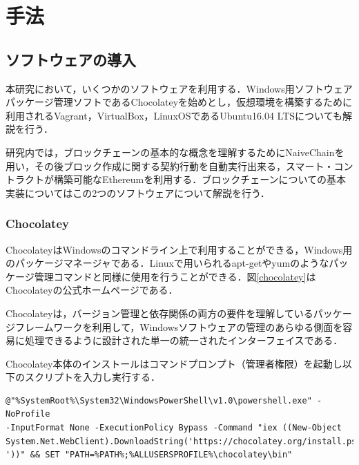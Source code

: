 \chapter{手法}

\section{ソフトウェアの導入}

本研究において，いくつかのソフトウェアを利用する．Windows用ソフトウェアパッケージ管理ソフトであるChocolateyを始めとし，仮想環境を構築するために利用されるVagrant，VirtualBox，LinuxOSであるUbuntu16.04 LTSについても解説を行う．

研究内では，ブロックチェーンの基本的な概念を理解するためにNaiveChainを用い，その後ブロック作成に関する契約行動を自動実行出来る，スマート・コントラクトが構築可能なEthereumを利用する．ブロックチェーンについての基本実装についてはこの2つのソフトウェアについて解説を行う．

\newpage

\subsection{Chocolatey}

Chocolatey\cite{chocolatey}はWindowsのコマンドライン上で利用することができる，Windows用のパッケージマネージャである．Linuxで用いられるapt-getやyumのようなパッケージ管理コマンドと同様に使用を行うことができる．図\ref{chocolatey}はChocolateyの公式ホームページである．

Chocolateyは，バージョン管理と依存関係の両方の要件を理解しているパッケージフレームワークを利用して，Windowsソフトウェアの管理のあらゆる側面を容易に処理できるように設計された単一の統一されたインターフェイスである．

Chocolatey本体のインストールはコマンドプロンプト（管理者権限）を起動し以下のスクリプトを入力し実行する．

\begin{verbatim}
@"%SystemRoot%\System32\WindowsPowerShell\v1.0\powershell.exe" -NoProfile 
-InputFormat None -ExecutionPolicy Bypass -Command "iex ((New-Object 
System.Net.WebClient).DownloadString('https://chocolatey.org/install.ps1
'))" && SET "PATH=%PATH%;%ALLUSERSPROFILE%\chocolatey\bin"
\end{verbatim}

